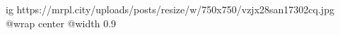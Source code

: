  
 
 
 
 

\ifcmt
  ig https://mrpl.city/uploads/posts/resize/w/750x750/vzjx28san17302cq.jpg
  @wrap center
  @width 0.9
\fi

